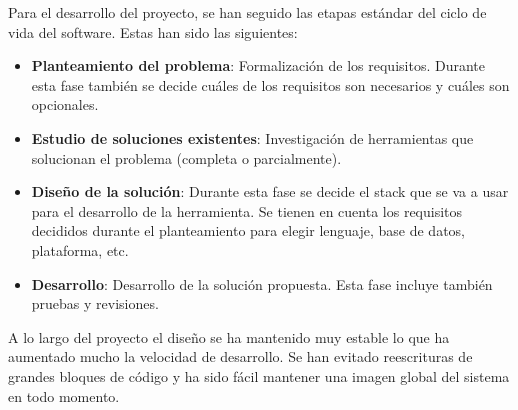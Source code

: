 Para el desarrollo del proyecto, se han seguido las etapas estándar del ciclo de vida del software. Estas han sido las siguientes:

\begin{itemize}
    \item \textbf{Planteamiento del problema}: Formalización de los requisitos. Durante esta fase también se decide cuáles de los requisitos son necesarios y cuáles son opcionales.
    \item \textbf{Estudio de soluciones existentes}: Investigación de herramientas que solucionan el problema (completa o parcialmente).
    \item \textbf{Diseño de la solución}: Durante esta fase se decide el stack que se va a usar para el desarrollo de la herramienta. Se tienen en cuenta los requisitos decididos durante el planteamiento para elegir lenguaje, base de datos, plataforma, etc.
    \item \textbf{Desarrollo}: Desarrollo de la solución propuesta. Esta fase incluye también pruebas y revisiones.
\end{itemize}

A lo largo del proyecto el diseño se ha mantenido muy estable lo que ha aumentado mucho la velocidad de desarrollo. Se han evitado reescrituras de grandes bloques de código y ha sido fácil mantener una imagen global del sistema en todo momento.
